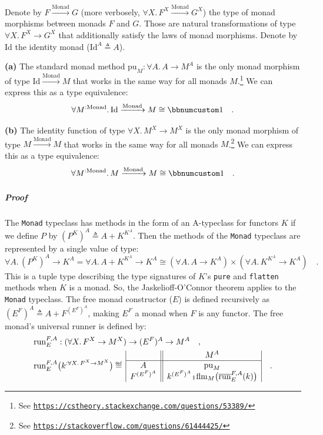 Denote by $F\xrightarrow{\text{Monad}}G$ (more verbosely, $\forall X.\,F^{X}\xrightarrow{\text{Monad}}G^{X}$)
the type of monad morphisms between monads $F$ and $G$. Those are
natural transformations of type $\forall X.\,F^{X}\rightarrow G^{X}$
that additionally satisfy the laws of monad morphisms. Denote by $\text{Id}$
the identity monad ($\text{Id}^{A}\triangleq A$). 

\textbf{(a)} The standard monad method $\text{pu}_{M}:\forall A.\,A\rightarrow M^{A}$
is the only monad morphism of type $\text{Id}\xrightarrow{\text{Monad}}M$
that works in the same way for all monads $M$.\footnote{See \texttt{\href{https://cstheory.stackexchange.com/questions/53389/}{https://cstheory.stackexchange.com/questions/53389/}}}
We can express this as a type equivalence: 
\[
\forall M^{:\text{Monad}}.\,\text{Id}\xrightarrow{\text{Monad}}M\cong\bbnum 1\quad.
\]

\textbf{(b)} The identity function of type $\forall X.\,M^{X}\rightarrow M^{X}$
is the only monad morphism of type $M\xrightarrow{\text{Monad}}M$
that works in the same way for all monads $M$.\footnote{See \texttt{\href{https://stackoverflow.com/questions/61444425/}{https://stackoverflow.com/questions/61444425/}}}
We can express this as a type equivalence: 
\[
\forall M^{:\text{Monad}}.\,M\xrightarrow{\text{Monad}}M\cong\bbnum 1\quad.
\]


\subparagraph{Proof}

The \lstinline!Monad! typeclass has methods in the form of an A-typeclass
for functors $K$ if we define $P$ by $(P^{K})^{A}\triangleq A+K^{K^{A}}$.
Then the methods of the \lstinline!Monad! typeclass are represented
by a single value of type: 
\[
\forall A.\,(P^{K})^{A}\rightarrow K^{A}=\forall A.\,A+K^{K^{A}}\rightarrow K^{A}\cong(\forall A.\,A\rightarrow K^{A})\times(\forall A.\,K^{K^{A}}\rightarrow K^{A})\quad.
\]
This is a tuple type describing the type signatures of $K$\textsf{'}s \lstinline!pure!
and \lstinline!flatten! methods when $K$ is a monad. So, the Jaskelioff-O\textsf{'}Connor
theorem applies to the \lstinline!Monad! typeclass. The free monad
constructor ($E$) is defined recursively as $(E^{F})^{A}\triangleq A+F^{(E^{F})^{A}}$,
making $E^{F}$ a monad when $F$ is any functor. The free monad\textsf{'}s
universal runner is defined by:
\begin{align*}
 & \text{run}_{E}^{F,A}:(\forall X.\,F^{X}\rightarrow M^{X})\rightarrow(E^{F})^{A}\rightarrow M^{A}\quad,\\
 & \text{run}_{E}^{F,A}\big(k^{:\forall X.\,F^{X}\rightarrow M^{X}}\big)\triangleq\,\begin{array}{|c||c|}
 & M^{A}\\
\hline A & \text{pu}_{M}\\
F^{(E^{F})^{A}} & k^{(E^{F})^{A}}\bef\text{flm}_{M}\big(\overline{\text{run}}_{E}^{F,A}(k)\big)
\end{array}\quad.
\end{align*}

